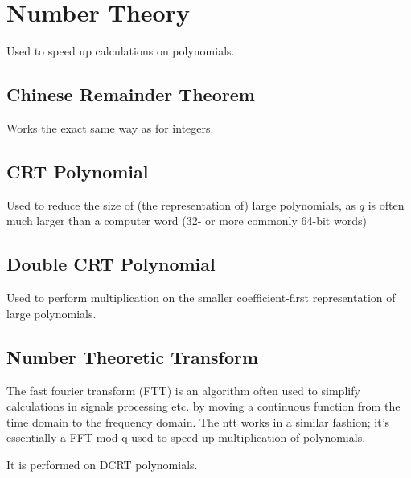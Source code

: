 \section{Number Theory}
Used to speed up calculations on polynomials.

\subsection{Chinese Remainder Theorem}
Works the exact same way as for integers.

\subsection{CRT Polynomial}
Used to reduce the size of (the representation of) large polynomials, as $q$ is often much larger than a computer word (32- or more commonly 64-bit words)

\subsection{Double CRT Polynomial}
Used to perform multiplication on the smaller coefficient-first representation of large polynomials.

\subsection{Number Theoretic Transform}
The fast fourier transform (FTT) is an algorithm often used to simplify calculations in signals processing etc. by moving a continuous function from the time domain to the frequency domain. The \gls{ntt} works in a similar fashion; it's essentially a FFT mod q used to speed up multiplication of polynomials.

It is performed on DCRT polynomials.